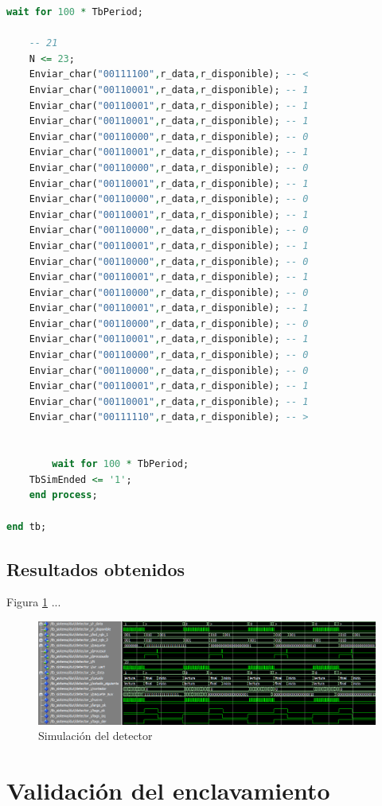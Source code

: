 \begin{lstlisting}[language = vhdl,caption=Testbench del módulo detector,label={lst:test_detector}]
	wait for 100 * TbPeriod;

	-- 21
	N <= 23; 	
	Enviar_char("00111100",r_data,r_disponible); -- < 	
	Enviar_char("00110001",r_data,r_disponible); -- 1 	
	Enviar_char("00110001",r_data,r_disponible); -- 1
 	Enviar_char("00110001",r_data,r_disponible); -- 1 	
	Enviar_char("00110000",r_data,r_disponible); -- 0
	Enviar_char("00110001",r_data,r_disponible); -- 1 	
	Enviar_char("00110000",r_data,r_disponible); -- 0
	Enviar_char("00110001",r_data,r_disponible); -- 1 	
	Enviar_char("00110000",r_data,r_disponible); -- 0
	Enviar_char("00110001",r_data,r_disponible); -- 1 	
	Enviar_char("00110000",r_data,r_disponible); -- 0
	Enviar_char("00110001",r_data,r_disponible); -- 1 	
	Enviar_char("00110000",r_data,r_disponible); -- 0
	Enviar_char("00110001",r_data,r_disponible); -- 1 	
	Enviar_char("00110000",r_data,r_disponible); -- 0
	Enviar_char("00110001",r_data,r_disponible); -- 1 	
	Enviar_char("00110000",r_data,r_disponible); -- 0
	Enviar_char("00110001",r_data,r_disponible); -- 1 	
	Enviar_char("00110000",r_data,r_disponible); -- 0
	Enviar_char("00110000",r_data,r_disponible); -- 0 	
	Enviar_char("00110001",r_data,r_disponible); -- 1
	Enviar_char("00110001",r_data,r_disponible); -- 1 	
	Enviar_char("00111110",r_data,r_disponible); -- >


        wait for 100 * TbPeriod;
	TbSimEnded <= '1';
    end process;
	
end tb;
		\end{lstlisting}
			
	\subsection{Resultados obtenidos}
				
		Figura \ref{fig:Test_Detector} ...
		
		\begin{figure}[h]
		\centering
		\includegraphics[scale=0.5]{./Figures/Test/Detector}
			\caption{Simulación del detector}
			\label{fig:Test_Detector}
		\end{figure}

\section{Validación del enclavamiento}	

